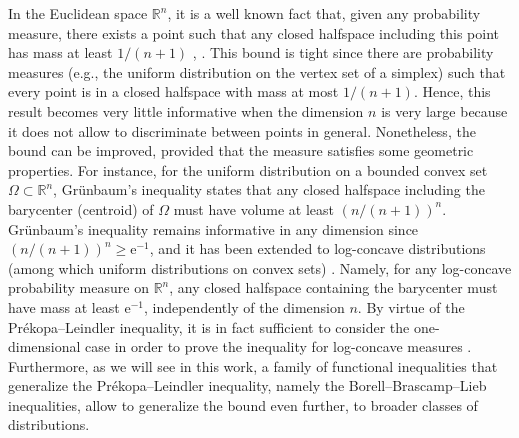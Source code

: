 \documentclass[sts]{imsart}
\theoremstyle{definition}
\theoremstyle{remark}
\newcommand{\R}{\mathbb{R}}
\newcommand{\e}{\mathrm{e}}
\begin{document}
In the Euclidean space $\R^n$, it is a well known fact that, given any probability measure, there exists a point such that any closed halfspace including this point has mass at least $1/(n+1)$ \cite[Theorem 1]{Gr}, \cite[Lemma 6.3]{donoho1992breakdown}.
This bound is tight since there are probability measures (e.g., the uniform distribution on the vertex set of a simplex) such that every point is in a closed halfspace with mass at most $1/(n+1)$.
Hence, this result becomes very little informative when the dimension $n$ is very large because it does not allow to discriminate between points in general.
Nonetheless, the bound can be improved, provided that the measure satisfies some geometric properties.
For instance, for the uniform distribution on a bounded convex set $\Omega \subset \R^n$, Gr\"unbaum's inequality \cite[Theorem 2]{Gr} states that any closed halfspace including the barycenter (centroid) of $\Omega$ must have volume at least $(n/(n+1))^n$.
Gr\"unbaum's inequality remains informative in any dimension since $(n/(n+1))^n \ge \e^{-1}$,
and it has been extended to log-concave distributions (among which uniform distributions on convex sets) \cite[Lemma 5.12]{lovasz2007geometry}.
Namely, for any log-concave probability measure on $\R^n$, any closed halfspace containing the barycenter must have mass at least $\e^{-1}$, independently of the dimension $n$.
By virtue of the Pr\'ekopa--Leindler inequality, it is in fact sufficient to consider the one-dimensional case in order to prove the inequality for log-concave measures \cite{lovasz2007geometry}.
Furthermore, as we will see in this work, a family of functional inequalities that generalize the Pr\'ekopa--Leindler inequality, namely the Borell--Brascamp--Lieb inequalities, allow to generalize the bound even further, to broader classes of distributions. 
\end{document}
